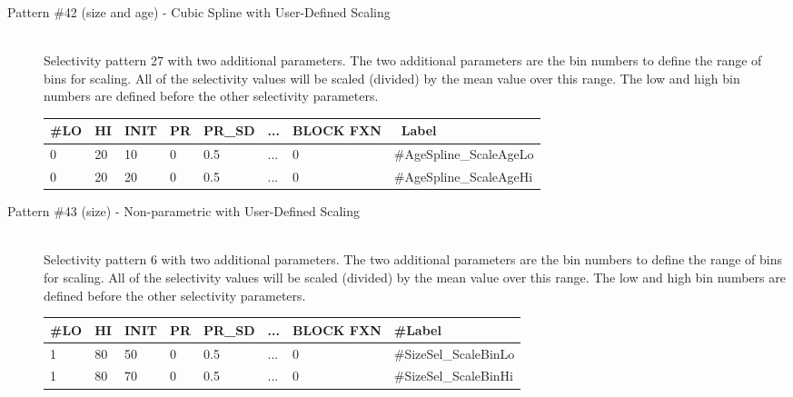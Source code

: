 \begin{description}
	\item[Pattern \#42 (size and age) - Cubic Spline with User-Defined Scaling]\hfil\\
	Selectivity pattern 27 with two additional parameters. The two additional parameters are the bin numbers to define the range of bins for scaling. All of the selectivity values will be scaled (divided) by the mean value over this range. The low and high bin numbers are defined before the other selectivity parameters.

	\begin{center}
		\begin{longtable}{p{0.8cm} p{0.8cm} p{1cm} p{0.8cm} p{1.75cm}p{1cm} p{1.2cm} p{5.2cm}}
		\hline
		\#LO & HI & INIT & PR & PR\_SD & ... & BLOCK FXN & \ Label \\
		\hline
		0 & 20 & 10 & 0 & 0.5 &  ... & 0 & \#AgeSpline\_ScaleAgeLo \\
		0 & 20 & 20 & 0 & 0.5 & ... & 0 & \#AgeSpline\_ScaleAgeHi \\
		\hline
		\end{longtable}
	\end{center}
\end{description}

\begin{description}
	\item[Pattern \#43 (size) - Non-parametric with User-Defined Scaling]\hfil\\
	Selectivity pattern 6 with two additional parameters. The two additional parameters are the bin numbers to define the range of bins for scaling. All of the selectivity values will be scaled (divided) by the mean value over this range. The low and high bin numbers are defined before the other selectivity parameters.
	
	\begin{center}
		\begin{longtable}{p{0.8cm} p{0.8cm} p{1cm} p{0.8cm} p{1.75cm}p{1cm} p{1.2cm} p{5.2cm}}
			\hline
			\#LO & HI & INIT & PR & PR\_SD  & ... & BLOCK FXN & \#Label \\
			\hline
			1 & 80 & 50 & 0 & 0.5  & ... & 0 & \#SizeSel\_ScaleBinLo \\
			1 & 80 & 70 & 0 & 0.5  & ... & 0 & \#SizeSel\_ScaleBinHi \\
			\hline
		\end{longtable}
	\end{center}
\end{description}

